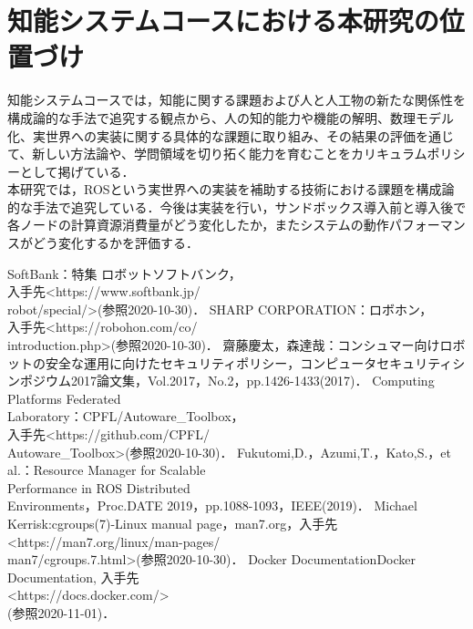 \documentclass[11pt]{ujarticle} %
\begin{document}
\section{知能システムコースにおける本研究の位置づけ}
知能システムコースでは，知能に関する課題および人と人工物の新たな関係性を構成論的な手法で追究する観点から、人の知的能力や機能の解明、数理モデル化、実世界への実装に関する具体的な課題に取り組み、その結果の評価を通じて、新しい方法論や、学問領域を切り拓く能力を育むことをカリキュラムポリシーとして掲げている．\\本研究では，ROSという実世界への実装を補助する技術における課題を構成論的な手法で追究している．今後は実装を行い，サンドボックス導入前と導入後で各ノードの計算資源消費量がどう変化したか，またシステムの動作パフォーマンスがどう変化するかを評価する．

\begin{thebibliography}{99}
  SoftBank：特集 \textbar ロボット\textbar ソフトバンク，\\入手先\textless https://www.softbank.jp/\\robot/special/\textgreater(参照2020-10-30)．
    SHARP CORPORATION：ロボホン，\\入手先\textless https://robohon.com/co/\\introduction.php\textgreater(参照2020-10-30)．
  齋藤慶太，森達哉：コンシュマー向けロボットの安全な運用に向けたセキュリティポリシー，コンピュータセキュリティシンポジウム2017論文集，Vol.2017，No.2，pp.1426-1433(2017)．
  Computing Platforms Federated \\Laboratory：CPFL/Autoware\_Toolbox，\\入手先\textless https://github.com/CPFL/\\Autoware\_Toolbox\textgreater(参照2020-10-30)．
  Fukutomi,D.，Azumi,T.，Kato,S.，et al.：Resource Manager for Scalable \\Performance in ROS Distributed \\Environments，Proc.DATE 2019，pp.1088-1093，IEEE(2019)．
  Michael Kerrisk:cgroups(7)-Linux manual page，man7.org，入手先\\\textless https://man7.org/linux/man-pages/\\man7/cgroups.7.html\textgreater(参照2020-10-30)．
  Docker Documentation\textbar Docker \\Documentation, 入手先\\\textless https://docs.docker.com/\textgreater\\(参照2020-11-01)．
\end{thebibliography}
\end{document}

